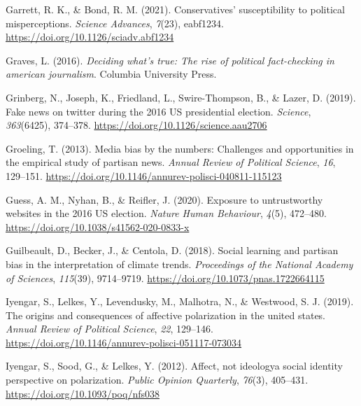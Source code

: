 \documentclass[
  12pt,
]{article}
\newlength{\cslhangindent}
\newlength{\cslentryspacingunit} %
\newenvironment{CSLReferences}[2] %
 {%
  \setlength{\parindent}{0pt}
  \ifodd #1
  \let\oldpar\par
  \def\par{\hangindent=\cslhangindent\oldpar}
  \fi
  \setlength{\parskip}{#2\cslentryspacingunit}
 }%
 {}
\begin{document}
\begin{CSLReferences}{1}{0}
\leavevmode{}%
Garrett, R. K., \& Bond, R. M. (2021). Conservatives' susceptibility to
political misperceptions. \emph{Science Advances}, \emph{7}(23),
eabf1234. \url{https://doi.org/10.1126/sciadv.abf1234}

\leavevmode{}%
Graves, L. (2016). \emph{Deciding what's true: The rise of political
fact-checking in american journalism}. Columbia University Press.

\leavevmode{}%
Grinberg, N., Joseph, K., Friedland, L., Swire-Thompson, B., \& Lazer,
D. (2019). Fake news on twitter during the 2016 US presidential
election. \emph{Science}, \emph{363}(6425), 374--378.
\url{https://doi.org/10.1126/science.aau2706}

\leavevmode{}%
Groeling, T. (2013). Media bias by the numbers: Challenges and
opportunities in the empirical study of partisan news. \emph{Annual
Review of Political Science}, \emph{16}, 129--151.
\url{https://doi.org/10.1146/annurev-polisci-040811-115123}

\leavevmode{}%
Guess, A. M., Nyhan, B., \& Reifler, J. (2020). Exposure to
untrustworthy websites in the 2016 US election. \emph{Nature Human
Behaviour}, \emph{4}(5), 472--480.
\url{https://doi.org/10.1038/s41562-020-0833-x}

\leavevmode{}%
Guilbeault, D., Becker, J., \& Centola, D. (2018). Social learning and
partisan bias in the interpretation of climate trends. \emph{Proceedings
of the National Academy of Sciences}, \emph{115}(39), 9714--9719.
\url{https://doi.org/10.1073/pnas.1722664115}

\leavevmode{}%
Iyengar, S., Lelkes, Y., Levendusky, M., Malhotra, N., \& Westwood, S.
J. (2019). The origins and consequences of affective polarization in the
united states. \emph{Annual Review of Political Science}, \emph{22},
129--146. \url{https://doi.org/10.1146/annurev-polisci-051117-073034}

\leavevmode{}%
Iyengar, S., Sood, G., \& Lelkes, Y. (2012). Affect, not ideologya
social identity perspective on polarization. \emph{Public Opinion
Quarterly}, \emph{76}(3), 405--431.
\url{https://doi.org/10.1093/poq/nfs038}


\end{CSLReferences}
\end{document}
